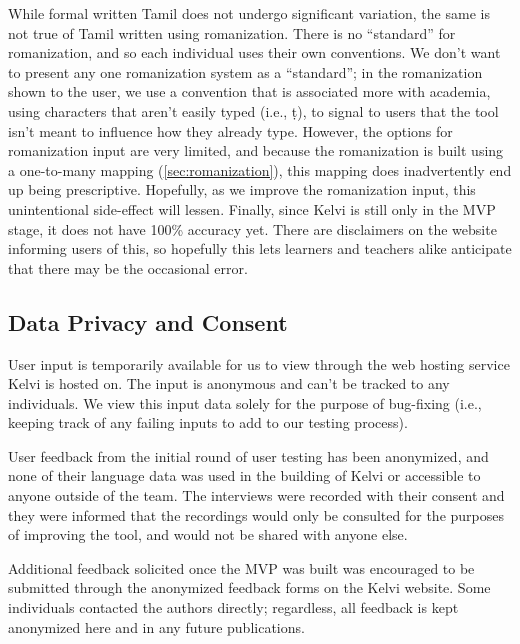 \documentclass[11pt]{article}
\begin{document}
While formal written Tamil does not undergo significant variation, the same is not 
true of Tamil written using romanization. There is no “standard” for romanization, 
and so each individual uses their own conventions. We don’t want to present any 
one romanization system as a “standard”; in the romanization shown to the user, 
we use a convention that is associated more with academia, using characters that 
aren’t easily typed (i.e., ṭ), to signal to users that the tool isn’t meant to 
influence how they already type. However, the options for romanization input are 
very limited, and because the romanization is built using a one-to-many mapping (\ref{sec:romanization}), 
this mapping does inadvertently end up being prescriptive. Hopefully, as we 
improve the romanization input, this unintentional side-effect will lessen. 
Finally, since Kelvi is still only in the MVP stage, it does not have 100\% accuracy yet. 
There are disclaimers on the website informing users of this, so hopefully 
this lets learners and teachers alike anticipate that there may be the occasional error.

\subsection{Data Privacy and Consent}
User input is temporarily available for us to view through the web hosting service Kelvi is hosted on. 
The input is anonymous and can’t be tracked to any individuals. We view this input 
data solely for the purpose of bug-fixing (i.e., keeping track of any failing inputs to add to our testing process).

User feedback from the initial round of user testing has been anonymized, and 
none of their language data was used in the building of Kelvi or accessible to anyone outside of the team. 
The interviews were recorded with their consent and they were informed that the recordings would only be 
consulted for the purposes of improving the tool, and would not be shared with anyone else.

Additional feedback solicited once the MVP was built was encouraged to be submitted through the 
anonymized feedback forms on the Kelvi website. 
Some individuals contacted the authors directly; regardless, all feedback is kept anonymized here and in any future publications.



\end{document}
